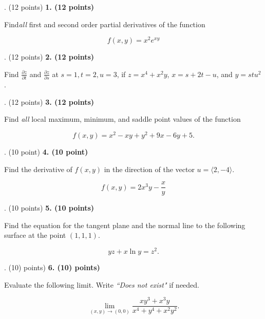 \documentclass[12pt]{article}
\makeatletter
\newenvironment{problem}[1][]{%
  \bigskip%
  \noindent\begin{boxedminipage}{\columnwidth}%
  \def\@tempa{#1}%
  \ifx\@tempa\empty\else%
    \textbf{#1}\hspace{0.5em}%
  \fi%
}{%
  \end{boxedminipage}%
}
\makeatother
\begin{document}
\newpage
\begin{problem}[1. (12 points)]
Find\emph{all} first and second order partial derivatives of the function

\begin{equation*}
    f(x,y) = x^2e^{xy}
\end{equation*}
\end{problem}


\newpage
\begin{problem}[2. (12 points)]
Find $\frac{\partial z}{\partial t}$ and $\frac{\partial z}{\partial s}$ at $s=1, t=2,u=3$, if $z = x^4+x^2y$, $x=s+2t-u$, and $y=stu^2$.
\end{problem}



\newpage
\begin{problem}[3. (12 points)]
Find \emph{all} local maximum, minimum, and saddle point values of the function

\begin{equation*}
    f(x,y)=x^2-xy+y^2+9x-6y+5.
\end{equation*}
\end{problem}


\newpage
\begin{problem}[4. (10 point)]
Find the derivative of $f(x,y)$ in the direction of the vector $u = \langle 2,-4\rangle$.

\begin{equation*}
    f(x,y) = 2x^3y-\frac{x}{y}
\end{equation*}
\end{problem}




\newpage
\begin{problem}[5. (10 points)]
Find the equation for the tangent plane and the normal line to the following surface at the point $(1,1,1)$.

\begin{equation*}
    yz + x\ln{y} = z^2.
\end{equation*}
\end{problem}


\newpage
\begin{problem}[6. (10) points)]
Evaluate the following limit. Write \emph{``Does not exist"} if needed.

\begin{equation*}
    \lim_{(x,y)\to (0,0)} \frac{xy^3+x^3y}{x^4+y^4+x^2y^2}.
\end{equation*}
\end{problem}
\end{document}
